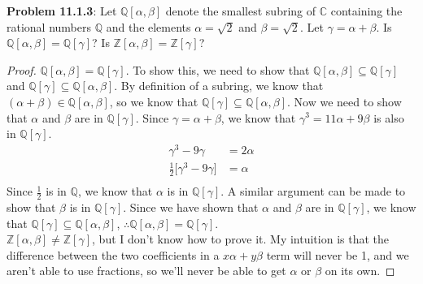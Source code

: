 \documentclass[12pt]{article}
\begin{document}
\textbf{Problem 11.1.3}: Let $\mathbb{Q}[\alpha, \beta]$ denote the smallest subring of $\mathbb{C}$ containing the rational numbers $\mathbb{Q}$ and the elements $\alpha = \sqrt{2}$ and $\beta = \sqrt{2}$. Let $\gamma = \alpha + \beta$. Is $\mathbb{Q}[\alpha, \beta] = \mathbb{Q}[\gamma]$? Is $\mathbb{Z}[\alpha, \beta] = \mathbb{Z}[\gamma]$?
\begin{proof}
$\mathbb{Q}[\alpha, \beta] = \mathbb{Q}[\gamma]$. To show this, we need to show that $\mathbb{Q}[\alpha, \beta] \subseteq \mathbb{Q}[\gamma]$ and $\mathbb{Q}[\gamma] \subseteq \mathbb{Q}[\alpha, \beta]$. By definition of a subring, we know that $(\alpha + \beta) \in \mathbb{Q}[\alpha, \beta]$, so we know that $\mathbb{Q}[\gamma] \subseteq \mathbb{Q}[\alpha, \beta]$. Now we need to show that $\alpha$ and $\beta$ are in $\mathbb{Q}[\gamma]$. Since $\gamma = \alpha + \beta$, we know that $\gamma^3 = 11\alpha + 9\beta$ is also in $\mathbb{Q}[\gamma]$.
\begin{align*}
  \gamma^3 - 9\gamma &= 2\alpha \\
  \frac{1}{2}\big[\gamma^3 - 9\gamma\big] &= \alpha \\
\end{align*}
Since $\frac{1}{2}$ is in $\mathbb{Q}$, we know that $\alpha$ is in $\mathbb{Q}[\gamma]$. A similar argument can be made to show that $\beta$ is in $\mathbb{Q}[\gamma]$. Since we have shown that $\alpha$ and $\beta$ are in $\mathbb{Q}[\gamma]$, we know that $\mathbb{Q}[\gamma] \subseteq \mathbb{Q}[\alpha, \beta]$, $\therefore \mathbb{Q}[\alpha, \beta] = \mathbb{Q}[\gamma]$. \\

$\mathbb{Z}[\alpha, \beta] \neq \mathbb{Z}[\gamma]$, but I don't know how to prove it. My intuition is that the difference between the two coefficients in a $x\alpha + y\beta$ term will never be 1, and we aren't able to use fractions, so we'll never be able to get $\alpha$ or $\beta$ on its own.
\end{proof}
\end{document}

